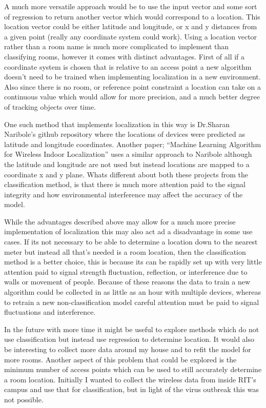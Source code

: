 \documentclass[12pt,letterpaper]{article}
\begin{document}
\par A much more versatile approach would be to use the input vector and some sort of regression to return another vector which would correspond to a location. This location vector could be either latitude and longitude, or x and y distances from a given point (really any coordinate system could work). Using a location vector rather than a room name is much more complicated to implement than classifying rooms, however it comes with distinct advantages. First of all if a coordinate system is chosen that is relative to an access point a new algorithm doesn't need to be trained when implementing localization in a new environment. Also since there is no room, or reference point constraint a location can take on a continuous value which would allow for more precision, and a much better degree of tracking objects over time.

\par One such method that implements localization in this way is Dr.Sharan Naribole's github repository where the locations of devices were predicted as latitude and longitude coordinates. Another paper; ``Machine Learning Algorithm for Wireless Indoor Localization'' uses a similar approach to Naribole although the latitude and longitude are not used but instead locations are mapped to a coordinate x and y plane. Whats different about both these projects from the classification method, is that there is much more attention paid to the signal integrity and how environmental interference may affect the accuracy of the model.

\par While the advantages described above may allow for a much more precise implementation of localization this may also act ad a disadvantage in some use cases. If its not necessary to be able to determine a location down to the nearest meter but instead all that's needed is a room location, then the classification method is a better choice, this is because its can be rapidly set up with very little attention paid to signal strength fluctuation, reflection, or interference due to walls or movement of people. Because of these reasons the data to train a new algorithm could be collected in as little as an hour with multiple devices, whereas to retrain a new non-classification model careful attention must be paid to signal fluctuations and interference.

\par In the future with more time it might be useful to explore methods which do not use classification but instead use regression to determine location. It would also be interesting to collect more data around my house and to refit the model for more rooms. Another aspect of this problem that could be explored is the minimum number of access points which can be used to still accurately determine a room location. Initially I wanted to collect the wireless data from inside RIT's campus and use that for classification, but in light of the virus outbreak this was not possible.
\end{document}
